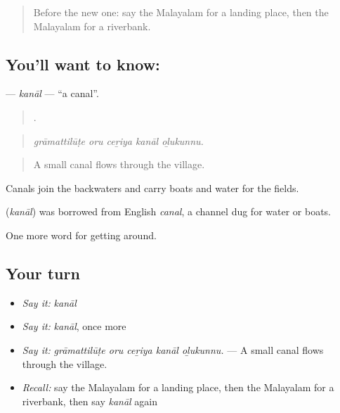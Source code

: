 \label{lesson:ML-C477-kanal}



\begin{quote}
Before the new one: say the Malayalam for a landing place, then the Malayalam for a riverbank.
\end{quote}

\subsection*{You'll want to know: }
\textbf{} — \emph{kanāl} — \textquotedblleft{}a canal\textquotedblright{}.

\begin{quote}
    .
\end{quote}

\begin{quote}
\emph{grāmattilūṭe oru ceṟiya kanāl oḻukunnu.}
\end{quote}

\begin{quote}
A small canal flows through the village.
\end{quote}

Canals join the backwaters and carry boats and water for the fields.

\begin{cousinweb}
\textbf{} (\emph{kanāl}) was borrowed from English \emph{canal}, a channel dug for water or boats.
\end{cousinweb}

\begin{grammarlens}[title={What you've built}]
One more word for getting around.
\end{grammarlens}

\subsection*{Your turn}
\begin{itemize}
\raggedright
  \item \emph{Say it:} \emph{kanāl}
  \item \emph{Say it:} \emph{kanāl}, once more
  \item \emph{Say it:} \emph{grāmattilūṭe oru ceṟiya kanāl oḻukunnu.} — A small canal flows through the village.
  \item \emph{Recall:} say the Malayalam for a landing place, then the Malayalam for a riverbank, then say \emph{kanāl} again
\end{itemize}

